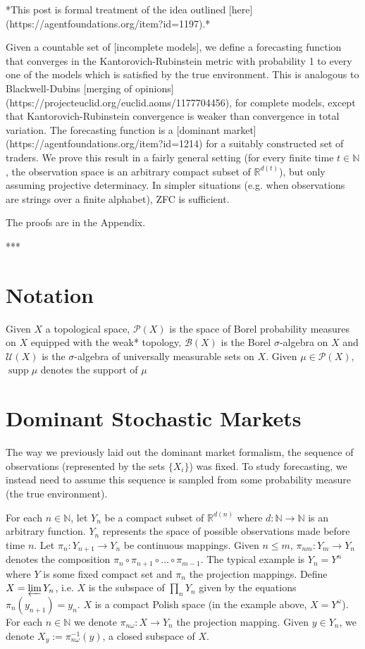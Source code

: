 \documentclass[a4paper]{article}
\DeclareMathOperator{\Supp}{supp}
\newcommand{\Nats}{\mathbb{N}}
\newcommand{\Reals}{\mathbb{R}}
\newcommand{\Prob}{\mathcal{P}}
\newcommand{\UM}{\mathcal{U}}
\begin{document}
*This post is formal treatment of the idea outlined [here](https://agentfoundations.org/item?id=1197).*

Given a countable set of [incomplete models], we define a forecasting function that converges in the Kantorovich-Rubinstein metric with probability 1 to every one of the models which is satisfied by the true environment. This is analogous to Blackwell-Dubins [merging of opinions](https://projecteuclid.org/euclid.aoms/1177704456), for complete models, except that Kantorovich-Rubinstein convergence is weaker than convergence in total variation. The forecasting function is a [dominant market](https://agentfoundations.org/item?id=1214) for a suitably constructed set of traders. We prove this result in a fairly general setting (for every finite time $t \in \Nats$, the observation space is an arbitrary compact subset of $\Reals^{d(t)}$), but only assuming projective determinacy. In simpler situations (e.g. when observations are strings over a finite alphabet), ZFC is sufficient.

The proofs are in the Appendix.

***

\section{Notation}

Given ${X}$ a topological space, ${\Prob(X)}$ is the space of Borel probability measures on ${X}$ equipped with the weak* topology, ${\mathcal{B}}(X)$ is the Borel ${\sigma}$-algebra on ${X}$ and ${\UM(X)}$ is the ${\sigma}$-algebra of universally measurable sets on ${X}$. Given ${\mu \in \Prob(X)}$, ${\Supp \mu}$ denotes the support of ${\mu}$

\section{Dominant Stochastic Markets}

The way we previously laid out the dominant market formalism, the sequence of observations (represented by the sets $\{X_i\}$) was fixed. To study forecasting, we instead need to assume this sequence is sampled from some probability measure (the true environment).

For each ${n \in \Nats}$, let ${Y_n}$ be a compact subset of ${\Reals^{d(n)}}$ where ${d: \Nats \rightarrow \Nats}$ is an arbitrary function. ${Y_n}$ represents the space of possible observations made before time ${n}$. Let ${\pi_n: Y_{n+1} \rightarrow Y_n}$ be continuous mappings. Given ${n \leq m}$, ${\pi_{nm}: Y_m \rightarrow Y_n}$ denotes the composition $\pi_n \circ \pi_{n+1} \circ \ldots \circ \pi_{m-1}$. The typical example is ${Y_n=Y^n}$ where ${Y}$ is some fixed compact set and ${\pi_n}$ the projection mappings. Define ${X = \varprojlim Y_n}$, i.e. ${X}$ is the subspace of ${\prod_n Y_n}$ given by the equations ${\pi_n(y_{n+1})=y_n}$. ${X}$ is a compact Polish space (in the example above, ${X = Y^\omega}$). For each ${n \in \Nats}$ we denote ${\pi_{n\omega}: X \rightarrow Y_n}$ the projection mapping. Given ${y \in Y_n}$, we denote ${X_y:=\pi_{n\omega}^{-1}(y)}$, a closed subspace of ${X}$.
\end{document}
